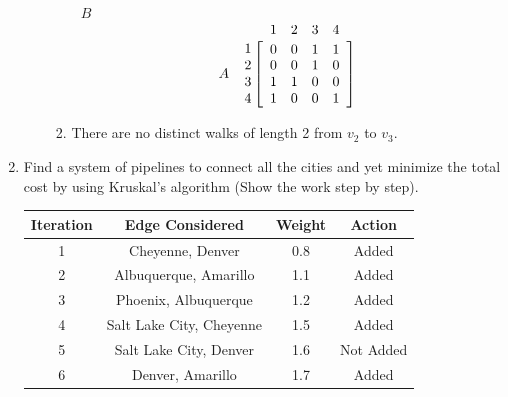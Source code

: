 \documentclass{article}
\newcommand{\indsize}{}
\newcommand{\colind}[2]{\displaystyle\smash{\mathop{#1}^{\raisebox{.5\normalbaselineskip}{\indsize #2}}}}
\newcommand{\rowind}[1]{\mbox{\indsize #1}}
\begin{document}
\begin{enumerate}
\begin{enumerate}
\begin{enumerate}
            \begin{center}
                $\:\:\:B$
            \end{center}
            \[
                A \: \: \: \: \:
              \begin{array}{@{}c@{}}
                \rowind{1} \\ \rowind{2} \\ \rowind{3} \\ \rowind{4}
              \end{array}
              \mathop{\left[
              \begin{array}{ *{4}{c} }
                 \colind{0}{1}  &  \colind{0}{2}  &  \colind{1}{3}  & \colind{1}{4}\\
                 0 & 0 & 1 & 0\\
                 1 & 1 & 0 & 0\\
                 1 & 0 & 0 & 1\\
              \end{array}
              \right]}^{
              }
            \]
            
            \item There are no distinct walks of length 2 from $v_{2}$ to $v_{3}$.
            
        \end{enumerate}
    \end{enumerate}

    \vspace{2cm}
    \item  Find a system of pipelines to connect all the cities and yet
    minimize the total cost by using Kruskal's algorithm (Show the work step by step).

    \begin{center}
    \begin{tabular}{ |c|c|c|c| }
        \hline
        \textbf{Iteration} & \textbf{Edge Considered} & \textbf{Weight} & \textbf{Action}\\
        \hline
        1 & Cheyenne, Denver & 0.8 & Added\\
        \hline
        2 & Albuquerque, Amarillo & 1.1 & Added\\
        \hline
        3 & Phoenix, Albuquerque & 1.2 & Added\\
        \hline
        4 & Salt Lake City, Cheyenne & 1.5 & Added\\
        \hline
        5 & Salt Lake City, Denver & 1.6 & Not Added\\
        \hline
        6 & Denver, Amarillo & 1.7 & Added\\
        \hline
    \end{tabular}


\end{center}
\end{enumerate}
\end{document}
